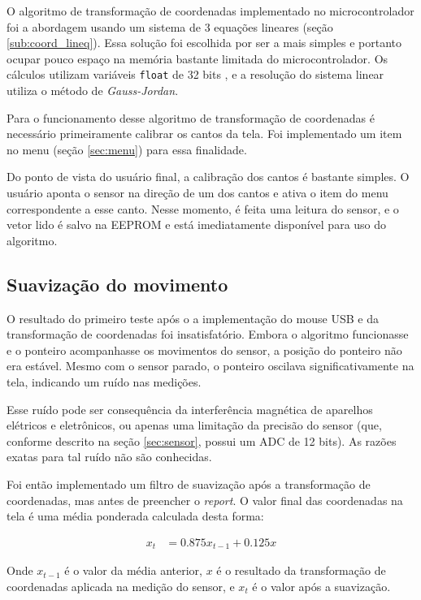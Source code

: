 \documentclass[brazil,pagestart=firstchapter]{abnt}
\begin{document}
O algoritmo de transformação de coordenadas implementado no microcontrolador
foi a abordagem usando um sistema de 3 equações lineares (seção
\ref{sub:coord_lineq}). Essa solução foi escolhida por ser a mais simples e
portanto ocupar pouco espaço na memória bastante limitada do
microcontrolador. Os cálculos utilizam variáveis \texttt{float} de 32 bits
\cite{avrlibcfaq}, e a resolução do sistema linear utiliza o método de
\textit{Gauss-Jordan}.

Para o funcionamento desse algoritmo de transformação de coordenadas é
necessário primeiramente calibrar os cantos da tela. Foi implementado um
item no menu (seção \ref{sec:menu}) para essa finalidade.

Do ponto de vista do usuário final, a calibração dos cantos é bastante
simples. O usuário aponta o sensor na direção de um dos cantos e ativa o
item do menu correspondente a esse canto. Nesse momento, é feita uma leitura
do sensor, e o vetor lido é salvo na \ac{EEPROM} e está imediatamente
disponível para uso do algoritmo.

\subsection{Suavização do movimento}
\label{sub:mouse_smoothing}

O resultado do primeiro teste após o a implementação do mouse \ac{USB} e da
transformação de coordenadas foi insatisfatório. Embora o algoritmo
funcionasse e o ponteiro acompanhasse os movimentos do sensor, a posição do
ponteiro não era estável. Mesmo com o sensor parado, o ponteiro oscilava
significativamente na tela, indicando um ruído nas medições.

Esse ruído pode ser consequência da interferência magnética de aparelhos
elétricos e eletrônicos, ou apenas uma limitação da precisão do sensor (que,
conforme descrito na seção \ref{sec:sensor}, possui um \ac{ADC} de 12 bits).
As razões exatas para tal ruído não são conhecidas.

Foi então implementado um filtro de suavização após a transformação de
coordenadas, mas antes de preencher o \textit{report}. O valor final das
coordenadas na tela é uma média ponderada calculada desta forma:

\begin{align*}
\label{eq:filtro_media_ponderada}
x_t & = 0.875 x_{t-1} + 0.125 x
\end{align*}

Onde $x_{t-1}$ é o valor da média anterior, $x$ é o resultado da
transformação de coordenadas aplicada na medição do sensor, e $x_t$ é o
valor após a suavização.
\end{document}
